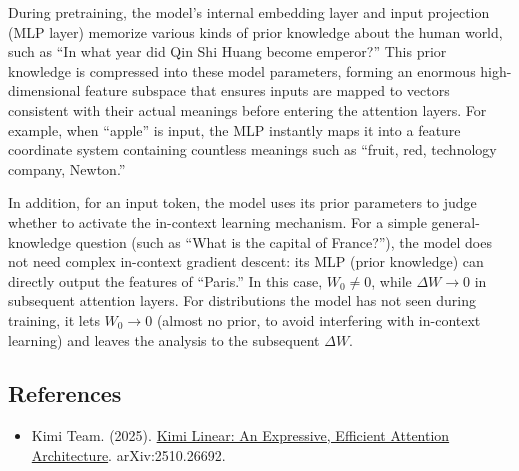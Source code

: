 During pretraining, the model's internal embedding layer and input projection (MLP layer) memorize various kinds of prior knowledge about the human world, such as ``In what year did Qin Shi Huang become emperor?'' This prior knowledge is compressed into these model parameters, forming an enormous high-dimensional feature subspace that ensures inputs are mapped to vectors consistent with their actual meanings before entering the attention layers. For example, when ``apple'' is input, the MLP instantly maps it into a feature coordinate system containing countless meanings such as ``fruit, red, technology company, Newton.''

In addition, for an input token, the model uses its prior parameters to judge whether to activate the in-context learning mechanism. For a simple general-knowledge question (such as ``What is the capital of France?''), the model does not need complex in-context gradient descent: its MLP (prior knowledge) can directly output the features of ``Paris.'' In this case, \(W_0\ne 0\), while \(\Delta W\to 0\) in subsequent attention layers. For distributions the model has not seen during training, it lets \(W_0\to 0\) (almost no prior, to avoid interfering with in-context learning) and leaves the analysis to the subsequent \(\Delta W\).

\FloatBarrier
{}
\hypertarget{references-99}{%
\subsection{References}\label{references-99}}

\vspace{0.25em}
\begin{itemize}
\tightlist
\item
  Kimi Team. (2025). \href{https://arxiv.org/abs/2510.26692}{Kimi Linear: An Expressive, Efficient Attention Architecture}. arXiv:2510.26692.
\end{itemize}

\clearpage
